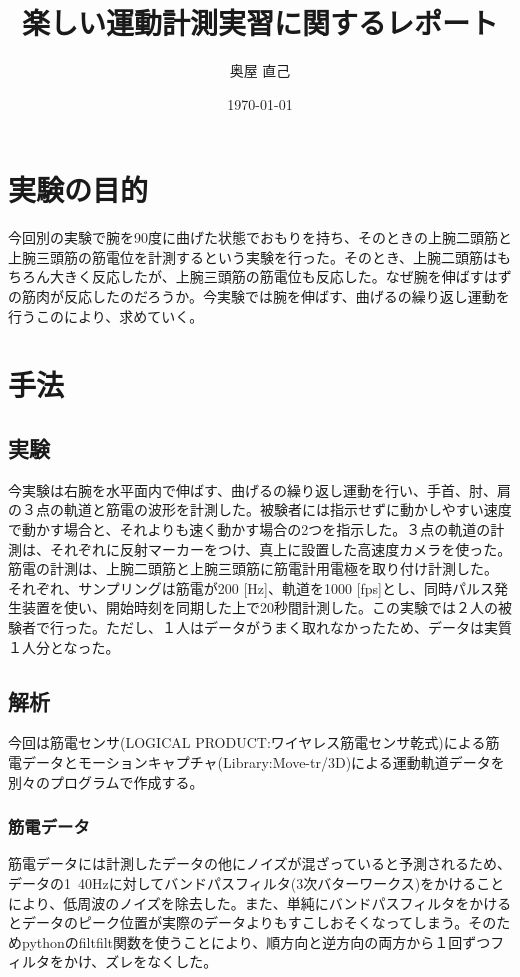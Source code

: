 \documentclass{jsarticle}
\title{楽しい運動計測実習に関するレポート}
\date{\today}
\author{奥屋 直己}
\begin{document}
\maketitle

\section{実験の目的}

今回別の実験で腕を90度に曲げた状態でおもりを持ち、そのときの上腕二頭筋と上腕三頭筋の筋電位を計測するという実験を行った。そのとき、上腕二頭筋はもちろん大きく反応したが、上腕三頭筋の筋電位も反応した。なぜ腕を伸ばすはずの筋肉が反応したのだろうか。今実験では腕を伸ばす、曲げるの繰り返し運動を行うこのにより、求めていく。

\section{手法}

\subsection{実験}

今実験は右腕を水平面内で伸ばす、曲げるの繰り返し運動を行い、手首、肘、肩の３点の軌道と筋電の波形を計測した。被験者には指示せずに動かしやすい速度で動かす場合と、それよりも速く動かす場合の2つを指示した。３点の軌道の計測は、それぞれに反射マーカーをつけ、真上に設置した高速度カメラを使った。筋電の計測は、上腕二頭筋と上腕三頭筋に筋電計用電極を取り付け計測した。
それぞれ、サンプリングは筋電が200 [Hz]、軌道を1000 [fps]とし、同時パルス発生装置を使い、開始時刻を同期した上で20秒間計測した。この実験では２人の被験者で行った。ただし、１人はデータがうまく取れなかったため、データは実質１人分となった。
\subsection{解析}

今回は筋電センサ(LOGICAL PRODUCT:ワイヤレス筋電センサ乾式)による筋電データとモーションキャプチャ(Library:Move-tr/3D)による運動軌道データを別々のプログラムで作成する。

\subsubsection{筋電データ}

筋電データには計測したデータの他にノイズが混ざっていると予測されるため、データの1~40Hzに対してバンドパスフィルタ(3次バターワークス)をかけることにより、低周波のノイズを除去した。また、単純にバンドパスフィルタをかけるとデータのピーク位置が実際のデータよりもすこしおそくなってしまう。そのためpythonのfiltfilt関数を使うことにより、順方向と逆方向の両方から１回ずつフィルタをかけ、ズレをなくした。
\end{document}
